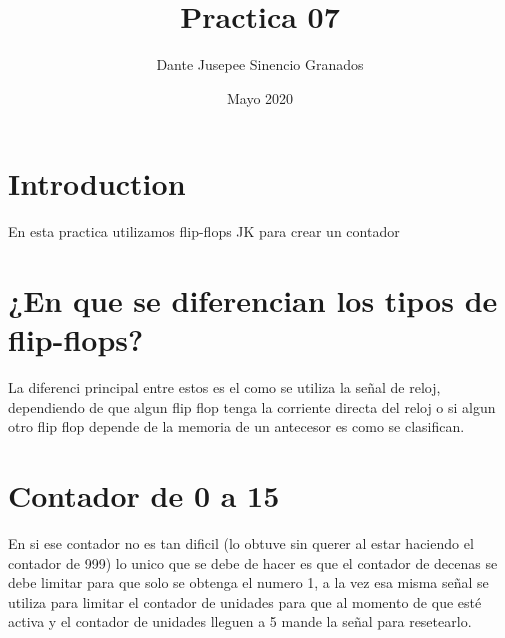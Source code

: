 \documentclass{article}
\title{Practica 07}
\author{Dante Jusepee Sinencio Granados}
\affil{Facultad de ciencias, UNAM}
\date{Mayo 2020}
\begin{document}
\maketitle

\section{Introduction}
En esta practica utilizamos flip-flops JK para crear un contador

\section{¿En que se diferencian los tipos de flip-flops?}
La diferenci principal entre estos es el como se utiliza la señal de reloj, dependiendo de que algun flip flop tenga la corriente directa del reloj o si algun otro flip flop depende de la memoria de un antecesor es como se clasifican.

\section{Contador de 0 a 15}
En si ese contador no es tan dificil (lo obtuve sin querer al estar haciendo el contador de 999) lo unico que se debe de hacer es que el contador de decenas se debe limitar para que solo se obtenga el numero 1, a la vez esa misma señal se utiliza para limitar el contador de unidades para que al momento de que esté activa y el contador de unidades lleguen a 5 mande la señal para resetearlo.
\end{document}
